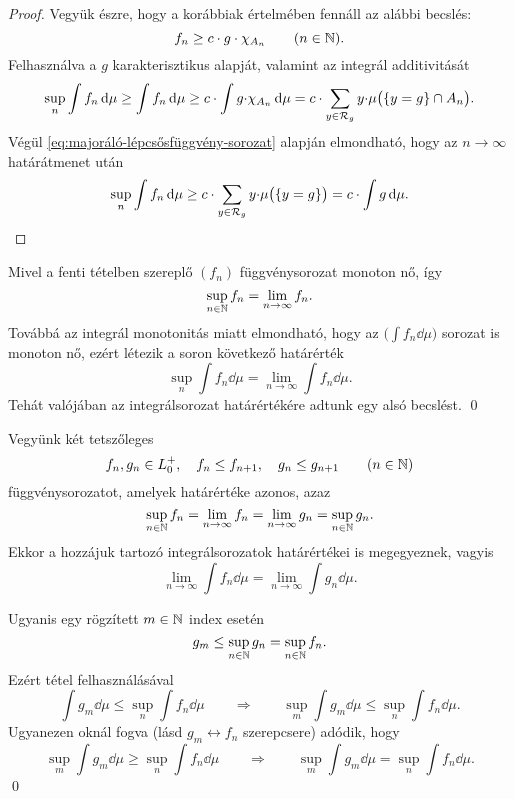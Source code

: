 \documentclass[
]{elteikthesis}[2024/04/26]
\begin{document}
\begin{proof}
		Vegyük észre, hogy a korábbiak értelmében fennáll az alábbi becslés:
		\[
			f_n \geq c \cdot g \cdot \chi_{A_n} \qquad (n \in \mathbb{N}).
		\]
		Felhasználva a \( g \) karakterisztikus alapját, 
		valamint az integrál additivitását
		\[
			\sup_{n} \int f_n \mathop{}\!\mathrm{d}{\mu} \geq
			\int f_n \mathop{}\!\mathrm{d}{\mu} \geq 
			c \cdot \int g {\cdot} \chi_{A_n} \mathop{}\!\mathrm{d}{\mu} = 
			c \cdot \sum_{y \in \mathcal{R}_{g}} y {\cdot} \mu\bigl( \{ y = g \} \cap A_n \bigr).
		\]
		Végül \eqref{eq:majoráló-lépcsősfüggvény-sorozat} alapján elmondható, 
		hogy az \( n \to \infty \) határátmenet után
		\[
			\sup_{n} \int f_n \mathop{}\!\mathrm{d}{\mu} \geq 
			c \cdot \sum_{y \in \mathcal{R}_{g}} y {\cdot} \mu\bigl( \{ y = g \} \bigr) =
			c \cdot \int g \mathop{}\!\mathrm{d}{\mu}.
		\]
	\end{proof}
	\newpage
	\begin{note}
		Mivel a fenti tételben szereplő \( (f_n) \) függvénysorozat monoton nő, így
		\[
			\sup_{n \in \mathbb{N}} f_n = \lim_{n \to \infty} f_n.
		\]
		Továbbá az integrál monotonitás miatt elmondható, 
		hogy az \( \bigl( \int f_n \dd{\mu} \bigr) \) sorozat is monoton nő,
		ezért létezik a soron következő határérték
		\[
			\sup_{n} \int f_n \dd{\mu} = 
			\lim_{n \to \infty} \int f_n \dd{\mu}.
		\]
		Tehát valójában az integrálsorozat határértékére adtunk egy alsó becslést. \qed 
	\end{note}
	
	\begin{theo*}
		Vegyünk két tetszőleges
		\[
			f_n, g_n \in \StepFuncPos, \quad 
			f_n \leq f_{n + 1}, \quad 
			g_n \leq g_{n + 1} \qquad (n \in \N)
		\]
		függvénysorozatot, amelyek határértéke azonos, azaz
		\[
			\sup_{n \in \mathbb{N}} f_n = 
			\lim_{n \to \infty} f_n = 
			\lim_{n \to \infty} g_n = 
			\sup_{n \in \mathbb{N}} g_n.
		\]
		Ekkor a hozzájuk tartozó integrálsorozatok határértékei is megegyeznek, vagyis
		\[
			\lim_{n \to \infty} \int f_n \dd{\mu} = 
			\lim_{n \to \infty} \int g_n \dd{\mu}.
		\]
	\end{theo*}
	\begin{proof*}
		Ugyanis egy rögzített \( m \in \mathbb{N} \) index esetén
		\[
			g_m \leq \sup_{n \in \mathbb{N}} g_n = \sup_{n \in \mathbb{N}} f_n.
		\]
		Ezért  tétel felhasználásával
		\[
			\int g_m \dd{\mu} \leq \sup_{n} \int f_n \dd{\mu}
			\qquad \Longrightarrow \qquad
			\sup_{m} \int g_m \dd{\mu} \leq \sup_{n} \int f_n \dd{\mu}.
		\]
		Ugyanezen oknál fogva (lásd \( g_m \longleftrightarrow f_n \) szerepcsere) adódik, hogy
		\[
			\sup_{m} \int g_m \dd{\mu} \geq \sup_{n} \int f_n \dd{\mu}
			\qquad \Longrightarrow \qquad
			\boxed{\sup_{m} \int g_m \dd{\mu} = \sup_{n} \int f_n \dd{\mu}}.
		\]
		\qed
	\end{proof*}
	
\end{document}
